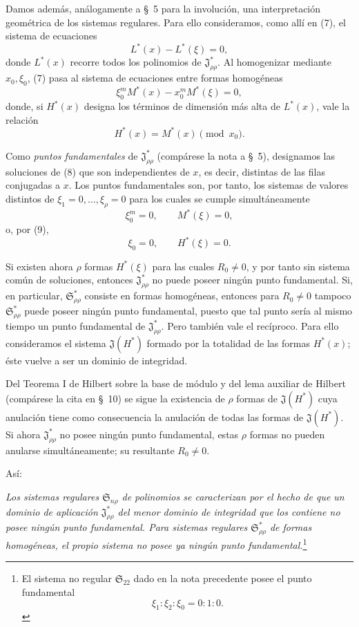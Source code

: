 \documentclass[11pt]{article}
\providecommand{\Ssys}{\mathfrak{S}}
\providecommand{\Jdom}{\mathfrak{J}}
\begin{document}
Damos además, análogamente a \S\ 5 para la involución, una interpretación geométrica de los sistemas regulares. Para ello consideramos, como allí en (7), el sistema de ecuaciones
\begin{equation}
  L^*(x)-L^*(\xi)=0,
\tag{7}
\end{equation}
donde $L^*(x)$ recorre todos los polinomios de $\Jdom^*_{\rho\rho}$. Al homogenizar mediante $x_0,\xi_0$, (7) pasa al sistema de ecuaciones entre formas homogéneas
\begin{equation}
  \xi_0^{m}M^*(x)-x_0^{m}M^*(\xi)=0,
\tag{8}
\end{equation}
donde, si $H^*(x)$ designa los términos de dimensión más alta de $L^*(x)$, vale la relación
\begin{equation}
  H^*(x)=M^*(x)\pmod{x_0}.
\tag{9}
\end{equation}

Como \emph{puntos fundamentales} de $\Jdom^*_{\rho\rho}$ (compárese la nota a \S\ 5), designamos las soluciones de (8) que son independientes de $x$, es decir, distintas de las filas conjugadas a $x$. Los puntos fundamentales son, por tanto, los sistemas de valores distintos de $\xi_1=0,\ldots,\xi_\rho=0$ para los cuales se cumple simultáneamente
\[
  \xi_0^m=0,
  \qquad M^*(\xi)=0,
\]
o, por (9),
\[
  \xi_0=0,
  \qquad H^*(\xi)=0.
\]

Si existen ahora $\rho$ formas $H^*(\xi)$ para las cuales $R_0\ne0$, y por tanto sin sistema común de soluciones, entonces $\Jdom^*_{\rho\rho}$ no puede poseer ningún punto fundamental. Si, en particular, $\Ssys^*_{\rho\rho}$ consiste en formas homogéneas, entonces para $R_0\ne0$ tampoco $\Ssys^*_{\rho\rho}$ puede poseer ningún punto fundamental, puesto que tal punto sería al mismo tiempo un punto fundamental de $\Jdom^*_{\rho\rho}$. Pero también vale el recíproco. Para ello consideramos el sistema $\Jdom(H^*)$ formado por la totalidad de las formas $H^*(x)$; éste vuelve a ser un dominio de integridad.

Del Teorema I de Hilbert sobre la base de módulo y del lema auxiliar de Hilbert (compárese la cita en \S\ 10) se sigue la existencia de $\rho$ formas de $\Jdom(H^*)$ cuya anulación tiene como consecuencia la anulación de todas las formas de $\Jdom(H^*)$. Si ahora $\Jdom^*_{\rho\rho}$ no posee ningún punto fundamental, estas $\rho$ formas no pueden anularse simultáneamente; su resultante $R_0\ne0$.

Así:

\emph{Los sistemas regulares $\Ssys_{n\rho}$ de polinomios se caracterizan por el hecho de que un dominio de aplicación $\Jdom^*_{\rho\rho}$ del menor dominio de integridad que los contiene no posee ningún punto fundamental. Para sistemas regulares $\Ssys^*_{\rho\rho}$ de formas homogéneas, el propio sistema no posee ya ningún punto fundamental.}\footnote{El sistema no regular $\Ssys_{22}$ dado en la nota precedente posee el punto fundamental
\[
  \xi_1:\xi_2:\xi_0=0:1:0.
\]}
\end{document}
